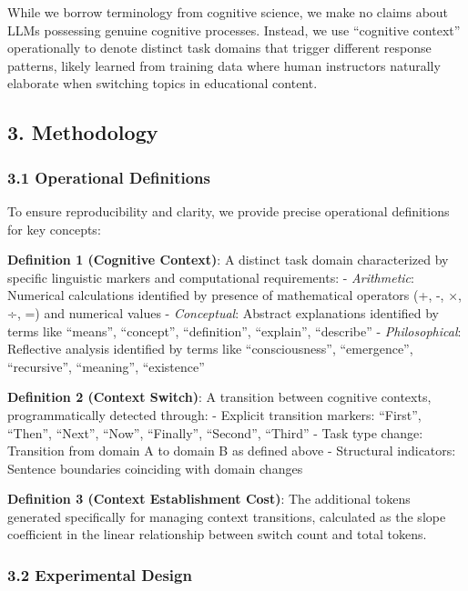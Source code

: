 \documentclass[
  11pt]{article}
\begin{document}
While we borrow terminology from cognitive science, we make no claims
about LLMs possessing genuine cognitive processes. Instead, we use
``cognitive context'' operationally to denote distinct task domains that
trigger different response patterns, likely learned from training data
where human instructors naturally elaborate when switching topics in
educational content.

\subsection{3. Methodology}\label{methodology}

\subsubsection{3.1 Operational
Definitions}\label{operational-definitions}

To ensure reproducibility and clarity, we provide precise operational
definitions for key concepts:

\textbf{Definition 1 (Cognitive Context)}: A distinct task domain
characterized by specific linguistic markers and computational
requirements: - \emph{Arithmetic}: Numerical calculations identified by
presence of mathematical operators (+, -, ×, ÷, =) and numerical values
- \emph{Conceptual}: Abstract explanations identified by terms like
``means'', ``concept'', ``definition'', ``explain'', ``describe'' -
\emph{Philosophical}: Reflective analysis identified by terms like
``consciousness'', ``emergence'', ``recursive'', ``meaning'',
``existence''

\textbf{Definition 2 (Context Switch)}: A transition between cognitive
contexts, programmatically detected through: - Explicit transition
markers: ``First'', ``Then'', ``Next'', ``Now'', ``Finally'',
``Second'', ``Third'' - Task type change: Transition from domain A to
domain B as defined above - Structural indicators: Sentence boundaries
coinciding with domain changes

\textbf{Definition 3 (Context Establishment Cost)}: The additional
tokens generated specifically for managing context transitions,
calculated as the slope coefficient in the linear relationship between
switch count and total tokens.

\subsubsection{3.2 Experimental Design}\label{experimental-design}
\end{document}
